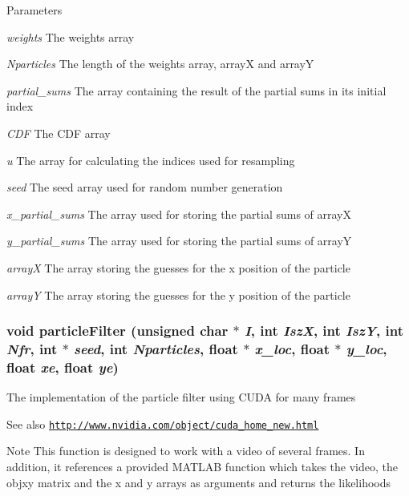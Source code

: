 \begin{DoxyParams}{Parameters}
\item[{\em weights}]The weights array \item[{\em Nparticles}]The length of the weights array, arrayX and arrayY \item[{\em partial\_\-sums}]The array containing the result of the partial sums in its initial index \item[{\em CDF}]The CDF array \item[{\em u}]The array for calculating the indices used for resampling \item[{\em seed}]The seed array used for random number generation \item[{\em x\_\-partial\_\-sums}]The array used for storing the partial sums of arrayX \item[{\em y\_\-partial\_\-sums}]The array used for storing the partial sums of arrayY \item[{\em arrayX}]The array storing the guesses for the x position of the particle \item[{\em arrayY}]The array storing the guesses for the y position of the particle \end{DoxyParams}
\hypertarget{ex__particle__CUDA__float_8cu_a05ed124716b895cf81222aee197d181d}{
\subsubsection[{particleFilter}]{\setlength{\rightskip}{0pt plus 5cm}void particleFilter (unsigned char $\ast$ {\em I}, \/  int {\em IszX}, \/  int {\em IszY}, \/  int {\em Nfr}, \/  int $\ast$ {\em seed}, \/  int {\em Nparticles}, \/  float $\ast$ {\em x\_\-loc}, \/  float $\ast$ {\em y\_\-loc}, \/  float {\em xe}, \/  float {\em ye})}}
\label{ex__particle__CUDA__float_8cu_a05ed124716b895cf81222aee197d181d}
The implementation of the particle filter using CUDA for many frames \begin{DoxySeeAlso}{See also}
\href{http://www.nvidia.com/object/cuda_home_new.html}{\tt http://www.nvidia.com/object/cuda\_\-home\_\-new.html} 
\end{DoxySeeAlso}
\begin{DoxyNote}{Note}
This function is designed to work with a video of several frames. In addition, it references a provided MATLAB function which takes the video, the objxy matrix and the x and y arrays as arguments and returns the likelihoods 
\end{DoxyNote}

